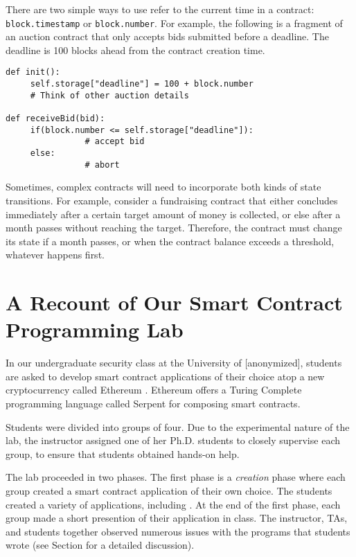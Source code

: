 \documentclass[10pt,twocolumn,letterpaper]{article}
\newcommand{\elaine}[1]{{\color{red}{[elaine: #1]}}}
\begin{document}
There are two simple ways to use refer to the current time in a contract: \texttt{block.timestamp} or \texttt{block.number}. For example, the following is a fragment of an auction contract that only accepts bids submitted before a deadline. The deadline is 100 blocks ahead from the contract creation time.

\begin{mdframed}
\begin{verbatim}
def init():
     self.storage["deadline"] = 100 + block.number                
     # Think of other auction details  

def receiveBid(bid):
     if(block.number <= self.storage["deadline"]):
                # accept bid
     else:
                # abort
\end{verbatim}
\end{mdframed}                

Sometimes, complex contracts will need to incorporate both kinds of state transitions. For example, consider a fundraising contract that either concludes immediately after a certain target amount of money is collected, or else after a month passes without reaching the target. Therefore, the contract must change its state if a month passes, or when the contract balance exceeds a threshold, whatever happens first.\\


\section{A Recount of Our Smart Contract Programming Lab}
In our undergraduate security class at the University of [anonymized], 
students are asked to develop smart contract applications of their choice
atop a new cryptocurrency called Ethereum \elaine{cite}.
Ethereum offers a Turing Complete programming language
called Serpent \elaine{cite} for composing smart contracts. 

Students were divided into groups of four.  
Due to the experimental nature of the lab, 
the instructor assigned one of her Ph.D. students 
to closely supervise each group, to ensure that students
obtained hands-on help.

The lab proceeded in two phases. 
The first phase is a 
{\it creation} phase where each group created a 
smart contract application
of their own choice.
The students created a variety of applications, including
\elaine{give a laundry list}.
At the end of the first phase, each group 
made a short presention of their 
application in class.
The instructor, TAs, and students together observed numerous issues  
with the programs that students 
wrote (see Section \elaine{refer} for a detailed
discussion). 
\end{document}
